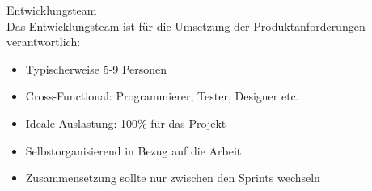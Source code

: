 \begin{definition}{Entwicklungsteam}\\
    Das Entwicklungsteam ist für die Umsetzung der Produktanforderungen verantwortlich:
    \begin{itemize}
        \item Typischerweise 5-9 Personen
        \item Cross-Functional: Programmierer, Tester, Designer etc.
        \item Ideale Auslastung: 100\% für das Projekt
        \item Selbstorganisierend in Bezug auf die Arbeit
        \item Zusammensetzung sollte nur zwischen den Sprints wechseln
    \end{itemize}
\end{definition}

